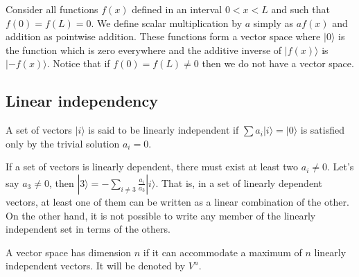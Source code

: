 \documentclass[11pt,fleqn]{book} %
\newcommand{\ket}[1]{| #1\rangle}
\begin{document}
\begin{example}
    Consider all functions $f(x)$ defined in an interval $0<x<L$ and such that $f(0)=f(L)=0$. 
    We define scalar multiplication by $a$ simply as $af(x)$ and addition as pointwise addition. These functions form a vector space where 
    $\ket{0}$ is the function which is zero everywhere and the additive inverse of $\ket{f(x)}$ is $\ket{-f(x)}$.
    Notice that if $f(0)=f(L)\neq 0$ then we do not have a vector space.
\end{example}

\subsection{Linear independency}
\begin{definition}
    A set of vectors $\ket{i}$ is said to be linearly independent if
    $\sum a_i\ket{i}=\ket{0}$
    is satisfied only by the trivial solution $a_i=0$.
\end{definition}

\begin{remark}
    If a set of vectors is linearly dependent, there must exist at least two $a_i\neq 0$. Let's say $a_3\neq 0$, then
    $\ket{3}=-\sum_{i\neq 3}\frac{a_i}{a_3}\ket{i}$. That is, in a set of linearly dependent vectors, at least one of them
    can be written as a linear combination of the other. On the other hand, it is not possible to write any member of the
    linearly independent set in terms of the others.
\end{remark}

\begin{definition}
    A vector space has dimension $n$ if it can accommodate a maximum
    of $n$ linearly independent vectors. It will be denoted by $V^n$.
\end{definition}
\end{document}
